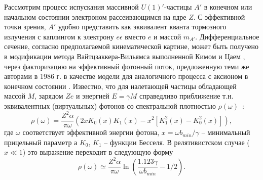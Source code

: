 Рассмотрим процесс испускания массивной $U(1)'$-частицы $A'$ в конечном или
начальном состоянии электроном рассеивающимся на ядре $Z$. С эффективной точки
зрения, $A'$ удобно представить как эквивалент кванта тормозного излучения
с каплингом к электрону $e \epsilon$ вместо $e$ и массой $m_{A'}$.
Дифференциальное сечение, согласно предполагаемой кинематической картине,
может быть получено в модификации метода Вайтцзаккера-Вильямса выполненной
Кимом и Цаем \cite{KimTsaiWWReview}, через факторизацию на эффективный фотонный
поток, предложенную теми же авторами в 1986 г. в качестве модели для
аналогичного процесса с аксионом в конечном состоянии \cite{tsai.axion}.
Известно, что для налетающей частицы обладающей массой $M$,
зарядом $Ze$ и энергией $E=\gamma M$ справедливо приближение т.н. эквивалентных
(виртуальных) фотонов со спектральной плотностью
$\rho (\omega)$~\cite{Weizsacker1934, Williams1934}:
\begin{equation}
    \rho ( \omega ) = \frac{Z^2 \alpha}{\pi \omega} ( 2 x K_0 (x) K_1 (x) - x^2 [K_1^2(x) - K_0^2(x) ] ),
    \label{eq:WWSpectrum}
\end{equation}
где $\omega$ соответствует эффективной энергии фотона,
$x = \omega b_{min} / \gamma$ -- минимальный прицельный параметр а
$K_0$, $K_1$ -- функции Бесселя. В релятивистском случае
($ x \ll 1 $) это выражение переходит в следующую форму
\begin{equation}
    \rho (\omega) \simeq \frac{Z^2 \alpha}{\pi \omega} \ln(\frac{1.123 \gamma}{\omega b_{min}} - 1/2).
\end{equation}


